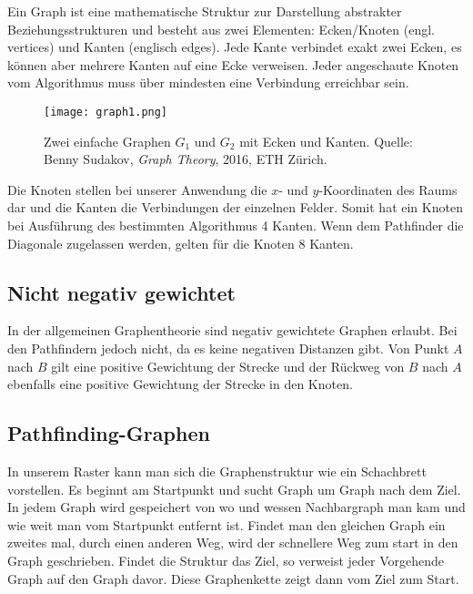 Ein Graph ist eine mathematische Struktur zur Darstellung abstrakter
Beziehungsstrukturen und besteht aus zwei Elementen: Ecken/Knoten (engl.
vertices) und Kanten (englisch edges). Jede Kante verbindet exakt zwei
Ecken, es können aber mehrere Kanten auf eine Ecke verweisen. Jeder
angeschaute Knoten vom Algorithmus muss über mindesten eine Verbindung
erreichbar sein.

\begin{figure}[H]
  \centering
  \texttt{[image: graph1.png]}
  \caption[Zwei einfache Graphen $G_1$ und $G_2$ mit Ecken und Kanten. Quelle: Benny Sudakov, \textit{Graph Theory}, 2016, ETH Zürich.]{Zwei einfache Graphen $G_1$ und $G_2$ mit Ecken und Kanten. Quelle: Benny Sudakov, \textit{Graph Theory}, 2016, ETH Zürich.}
  \label{fig:graph1}
\end{figure}

Die Knoten stellen bei unserer Anwendung die $x$- und $y$-Koordinaten des Raums
dar und die Kanten die Verbindungen der einzelnen Felder. Somit hat ein
Knoten bei Ausführung des bestimmten Algorithmus 4 Kanten. Wenn dem
Pathfinder die Diagonale zugelassen werden, gelten für die Knoten 8
Kanten.
\cite[Franz Embacher, 2003]{uniwiengraphen}

\subsection{Nicht negativ gewichtet}
\label{chap:nicht-negativ-gewichtet}

In der allgemeinen Graphentheorie sind negativ gewichtete Graphen
erlaubt. Bei den Pathfindern jedoch nicht, da es keine negativen
Distanzen gibt. Von Punkt $A$ nach $B$ gilt eine positive Gewichtung der
Strecke und der Rückweg von $B$ nach $A$ ebenfalls eine positive Gewichtung
der Strecke in den Knoten.
\cite[Krumke; Noltemeier; Schwarz; Wirth, 2000, S. 76]{graphtheoryconcepts}

\subsection{Pathfinding-Graphen}

In unserem Raster kann man sich die Graphenstruktur wie ein Schachbrett
vorstellen. Es beginnt am Startpunkt und sucht Graph um Graph nach dem Ziel.
In jedem Graph wird gespeichert von wo und wessen Nachbargraph man kam und
wie weit man vom Startpunkt entfernt ist. Findet man den gleichen Graph
ein zweites mal, durch einen anderen Weg, wird der schnellere Weg zum
start in den Graph geschrieben. Findet die Struktur das Ziel, so
verweist jeder Vorgehende Graph auf den Graph davor. Diese Graphenkette zeigt dann vom Ziel zum Start.
\cite[Vinther, Vinther, 2015, S. 22]{pftwodim}

